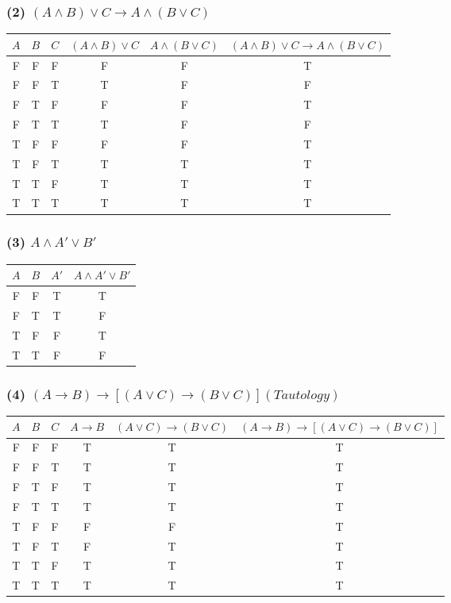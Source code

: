 \documentclass[12pt]{article}
\begin{document}
\subsubsection*{(2) \( (A \land B) \lor C \rightarrow A \land (B \lor C) \)}
\begin{tabular}{|c|c|c|c|c|c|}
\hline
\( A \) & \( B \) & \( C \) & \( (A \land B) \lor C \) & \( A \land (B \lor C) \) & \( (A \land B) \lor C \rightarrow A \land (B \lor C) \) \\
\hline
F & F & F & F & F & T \\
F & F & T & T & F & F \\
F & T & F & F & F & T \\
F & T & T & T & F & F \\
T & F & F & F & F & T \\
T & F & T & T & T & T \\
T & T & F & T & T & T \\
T & T & T & T & T & T \\
\hline
\end{tabular}
\subsubsection*{(3) \( A \land A' \lor B' \)}
\begin{tabular}{|c|c|c|c|}
\hline
\( A \) & \( B \) & \( A' \) & \( A \land A' \lor B' \) \\
\hline
F & F & T & T \\
F & T & T & F \\
T & F & F & T \\
T & T & F & F \\
\hline
\end{tabular}
\subsubsection*{(4) \( (A \rightarrow B) \rightarrow [(A \lor C) \rightarrow (B \lor C)] (Tautology) \)}
\begin{tabular}{|c|c|c|c|c|c|}
\hline
\( A \) & \( B \) & \( C \) & \( A \rightarrow B \) & \( (A \lor C) \rightarrow (B \lor C) \) & \( (A \rightarrow B) \rightarrow [(A \lor C) \rightarrow (B \lor C)] \) \\
\hline
F & F & F & T & T & T \\
F & F & T & T & T & T \\
F & T & F & T & T & T \\
F & T & T & T & T & T \\
T & F & F & F & F & T \\
T & F & T & F & T & T \\
T & T & F & T & T & T \\
T & T & T & T & T & T \\
\hline
\end{tabular}
\end{document}
